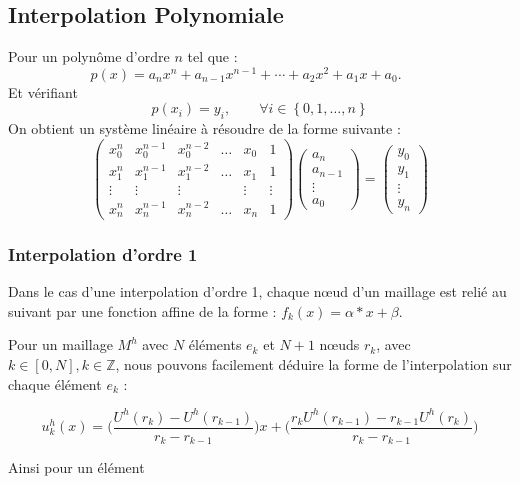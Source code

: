 \documentclass[a4paper,10pt]{report} %
\begin{document}
\subsection{Interpolation Polynomiale}

Pour un polynôme d'ordre $n$ tel que :
$$p(x) = a_n x^n + a_{n-1} x^{n-1} + \cdots + a_2 x^2 + a_1 x + a_0. \qquad$$ 
Et vérifiant $$p(x_i) = y_i,\qquad \forall i \in \left\{ 0, 1, \dots, n\right\}$$
On obtient un système linéaire à résoudre de la forme suivante :
\begin{equation}
\begin{pmatrix}
x_0^n & x_0^{n-1} & x_0^{n-2} & \ldots & x_0 & 1 \\
x_1^n & x_1^{n-1} & x_1^{n-2} & \ldots & x_1 & 1 \\
\vdots & \vdots & \vdots & & \vdots & \vdots \\
x_n^n & x_n^{n-1} & x_n^{n-2} & \ldots & x_n & 1 
\end{pmatrix}
\begin{pmatrix}
a_n \\
a_{n-1} \\
\vdots \\
a_0
\end{pmatrix}
=
\begin{pmatrix}
y_0 \\
y_1 \\
\vdots \\
y_n
\end{pmatrix}
\end{equation}

\subsubsection{Interpolation d'ordre 1}

Dans le cas d'une interpolation d'ordre 1, chaque nœud d'un maillage est relié au suivant par une fonction affine de la forme : $f_{k}(x)=\alpha*x+\beta$.

Pour un maillage $M^h$ avec $N$ éléments $e_{k}$ et $N+1$ nœuds $r_{k}$, avec $k\in [0,N],k\in\mathbb{Z}$, nous pouvons facilement déduire la forme de l'interpolation sur chaque élément $e_{k}$ :

\begin{equation}
	u^h_{k}(x)=\Big(\frac{U^h(r_{k})-U^h(r_{k-1})}{r_{k}-r_{k-1}}\Big)x+(\frac{r_{k}U^h(r_{k-1})-r_{k-1}U^h(r_{k})}{r_{k}-r_{k-1}}\Big)
	\label{interpolationP1}
\end{equation}

Ainsi pour un élément 
\end{document}
